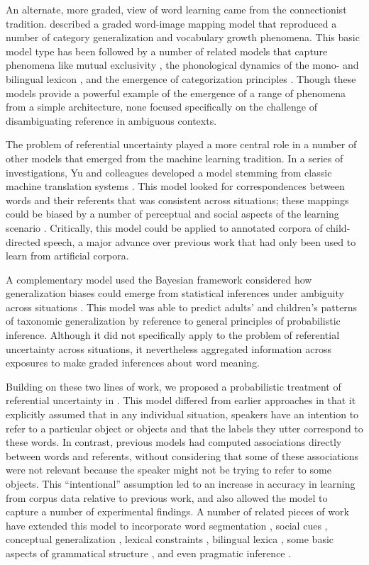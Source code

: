 \documentclass[man,noapacite,12pt]{apa2}
\begin{document}
An alternate, more graded, view of word learning came from the connectionist tradition.  described a graded word-image mapping model that reproduced a number of category generalization and vocabulary growth phenomena. This basic model type has been followed by a number of related models that capture phenomena like mutual exclusivity \cite{regier2005}, the phonological dynamics of the mono- and bilingual lexicon \cite{li2002,li2004,li2007}, and the emergence of categorization principles \cite{mayor2010}. Though these models provide a powerful example of the emergence of a range of phenomena from a simple architecture, none focused specifically on the challenge of disambiguating reference in ambiguous contexts. 

The problem of referential uncertainty played a more central role in a number of other models that emerged from the machine learning tradition. In a series of investigations, Yu and colleagues developed a model stemming from classic machine translation systems \cite{brown1993}. This model looked for correspondences between words and their referents that was consistent across situations; these mappings could be biased by a number of perceptual and social aspects of the learning scenario \cite{yu2005,yu2007}. Critically, this model could be applied to annotated corpora of child-directed speech, a major advance over previous work that had only been used to learn from artificial corpora. 

A complementary model used the Bayesian framework considered how generalization biases could emerge from statistical inferences under ambiguity across situations \cite{xu2007}. This model was able to predict adults' and children's patterns of taxonomic generalization by reference to general principles of probabilistic inference. Although it did not specifically apply to the problem of referential uncertainty across situations, it nevertheless aggregated information across exposures to make graded inferences about word meaning. 

Building on these two lines of work, we proposed a probabilistic treatment of referential uncertainty in . This model differed from earlier approaches in that it explicitly assumed that in any individual situation, speakers have an intention to refer to a particular object or objects and that the labels they utter correspond to these words. In contrast, previous models had computed associations directly between words and referents, without considering that some of these associations were not relevant because the speaker might not be trying to refer to some objects. This ``intentional'' assumption led to an increase in accuracy in learning from corpus data relative to previous work, and also allowed the model to capture a number of experimental findings. A number of related pieces of work have extended this model to incorporate word segmentation \cite{johnson2010}, social cues \cite{frank2008,johnson2012}, conceptual generalization \cite{lewis2013b}, lexical constraints \cite{lewis2013}, bilingual lexica \cite{zinserunderreview}, some basic aspects of grammatical structure \cite{johnson2010}, and even pragmatic inference \cite{smith2013}.
\end{document}
